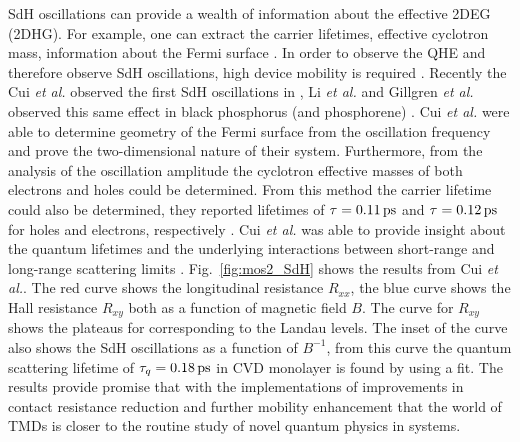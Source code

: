 \acs{SdH} oscillations can provide a wealth of information about the effective \acs{2DEG} (\acs{2DHG}). For example, one can extract the carrier lifetimes, effective cyclotron mass, information about the Fermi surface \cite{Li_NatureNano2015}. In order to observe the \acs{QHE} and therefore observe \acs{SdH} oscillations, high device mobility is required \cite{Das_Wiley1996,Tsukazak_Science2007}. Recently the Cui \emph{et al.} observed the first \acs{SdH} oscillations in , Li \emph{et al.} and Gillgren \emph{et al.} observed this same effect in black phosphorus (and phosphorene) \cite{Cui_NatureNano2015,Li_NatureNano2015,Gillgren_2DMat2015}. Cui \emph{et al.} were able to determine geometry of the Fermi surface from the oscillation frequency and prove the two-dimensional nature of their system. Furthermore, from the analysis of the oscillation amplitude the cyclotron effective masses of both electrons and holes could be determined. From this method the carrier lifetime could also be determined, they reported lifetimes of $\tau = 0.11\,\mathrm{ps}$ and $\tau = 0.12\,\mathrm{ps}$ for holes and electrons, respectively \cite{Li_NatureNano2015,Shoenberg_Magnet1984}. Cui \emph{et al.} was able to provide insight about the quantum lifetimes and the underlying interactions between short-range and long-range scattering limits \cite{Cui_NatureNano2015}. Fig.~\ref{fig:mos2_SdH} shows the results from Cui \emph{et al.}. The red curve shows the longitudinal resistance $R_{xx}$, the blue curve shows the Hall resistance $R_{xy}$ both as a function of magnetic field $B$. The curve for $R_{xy}$ shows the plateaus for corresponding to the Landau levels. The inset of the curve also shows the \acs{SdH} oscillations as a function of $B^{-1}$, from this curve the quantum scattering lifetime of $\tau_q=0.18\,\mathrm{ps}$ in \acs{CVD} monolayer  is found by using a fit. The results provide promise that with the implementations of improvements in contact resistance reduction and further mobility enhancement that the world of \acp{TMD} is closer to the routine study of novel quantum physics in \td systems. 

